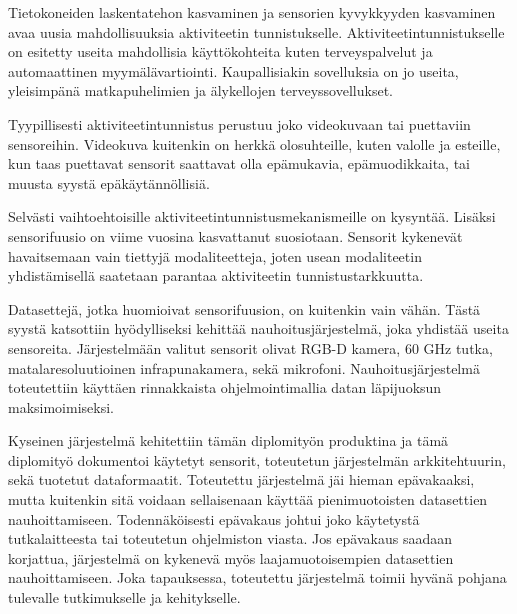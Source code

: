 Tietokoneiden laskentatehon kasvaminen ja sensorien kyvykkyyden kasvaminen avaa uusia mahdollisuuksia aktiviteetin tunnistukselle.
Aktiviteetintunnistukselle on esitetty useita mahdollisia käyttökohteita kuten terveyspalvelut ja automaattinen myymälävartiointi.
Kaupallisiakin sovelluksia on jo useita, yleisimpänä matkapuhelimien ja älykellojen terveyssovellukset.

Tyypillisesti aktiviteetintunnistus perustuu joko videokuvaan tai puettaviin sensoreihin.
Videokuva kuitenkin on herkkä olosuhteille, kuten valolle ja esteille,
kun taas puettavat sensorit saattavat olla epämukavia, epämuodikkaita, tai muusta syystä epäkäytännöllisiä.

Selvästi vaihtoehtoisille aktiviteetintunnistusmekanismeille on kysyntää.
Lisäksi sensorifuusio on viime vuosina kasvattanut suosiotaan.
Sensorit kykenevät havaitsemaan vain tiettyjä modaliteetteja,
joten usean modaliteetin yhdistämisellä saatetaan parantaa aktiviteetin tunnistustarkkuutta.

Datasettejä, jotka huomioivat sensorifuusion, on kuitenkin vain vähän.
Tästä syystä katsottiin hyödylliseksi kehittää nauhoitusjärjestelmä,
joka yhdistää useita sensoreita.
Järjestelmään valitut sensorit olivat RGB-D kamera, 60 GHz tutka, matalaresoluutioinen infrapunakamera, sekä mikrofoni.
Nauhoitusjärjestelmä toteutettiin käyttäen rinnakkaista ohjelmointimallia datan läpijuoksun maksimoimiseksi.

Kyseinen järjestelmä kehitettiin tämän diplomityön produktina ja tämä diplomityö dokumentoi käytetyt sensorit,
toteutetun järjestelmän arkkitehtuurin, sekä tuotetut dataformaatit.
Toteutettu järjestelmä jäi hieman epävakaaksi,
mutta kuitenkin sitä voidaan sellaisenaan käyttää pienimuotoisten datasettien nauhoittamiseen.
Todennäköisesti epävakaus johtui joko käytetystä tutkalaitteesta tai toteutetun ohjelmiston viasta.
Jos epävakaus saadaan korjattua,
järjestelmä on kykenevä myös laajamuotoisempien datasettien nauhoittamiseen.
Joka tapauksessa, toteutettu järjestelmä toimii hyvänä pohjana tulevalle tutkimukselle ja kehitykselle.